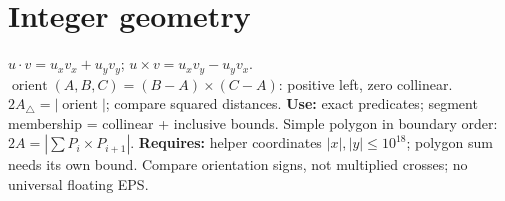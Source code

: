 \section{Integer geometry}
$u\cdot v=u_xv_x+u_yv_y$;
$u\times v=u_xv_y-u_yv_x$.
$\operatorname{orient}(A,B,C)=(B-A)\times(C-A)$: positive left, zero collinear.
$2A_{\triangle}=|\operatorname{orient}|$; compare squared distances.
\textbf{Use:} exact predicates; segment membership = collinear + inclusive bounds.
Simple polygon in boundary order: $2A=|\sum P_i\times P_{i+1}|$.
\textbf{Requires:} helper coordinates $|x|,|y|\le10^{18}$; polygon sum needs its own
bound. Compare orientation signs, not multiplied crosses; no universal floating EPS.




